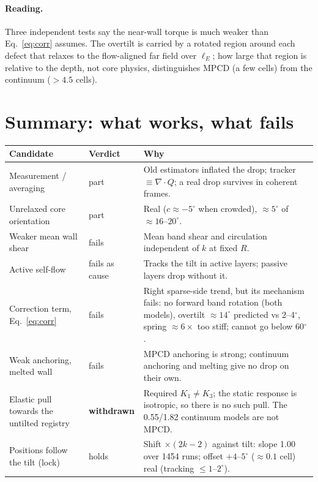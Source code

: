 \documentclass[11pt,a4paper]{article}
\begin{document}
\paragraph{Reading.} Three independent tests say the near-wall torque is much weaker than Eq.~\eqref{eq:corr} assumes. The overtilt is carried by a rotated
region around each defect that relaxes to the flow-aligned far field over $\ell_E$; how large that region is relative to the depth, not core physics,
distinguishes MPCD (a few cells) from the continuum ($>4.5$ cells).

\section{Summary: what works, what fails}

\begin{center}\small
\begin{tabular}{p{4.3cm}p{2cm}p{8.4cm}}
\toprule
Candidate & Verdict & Why \\
\midrule
Measurement / averaging & part & Old estimators inflated the drop; tracker $\equiv\nabla\!\cdot\!Q$; a real drop survives in coherent frames. \\
Unrelaxed core orientation & part & Real ($c\approx-5^\circ$ when crowded), $\approx5^\circ$ of $\approx16$--$20^\circ$. \\
Weaker mean wall shear & fails & Mean band shear and circulation independent of $k$ at fixed $R$. \\
Active self-flow & fails as cause & Tracks the tilt in active layers; passive layers drop without it. \\
Correction term, Eq.~\eqref{eq:corr} & fails & Right sparse-side trend, but its mechanism fails: no forward band rotation (both models), overtilt $\approx14^\circ$ predicted vs 2--4$^\circ$, spring $\approx6\times$ too stiff; cannot go below 60$^\circ$. \\
Weak anchoring, melted wall & fails & MPCD anchoring is strong; continuum anchoring and melting give no drop on their own. \\
Elastic pull towards the untilted registry & \textbf{withdrawn} & Required $K_1\neq K_3$; the static response is isotropic, so there is no such pull. The 0.55/1.82 continuum models are not MPCD. \\
Positions follow the tilt (lock) & holds & Shift $\times(2k-2)$ against tilt: slope 1.00 over 1454 runs; offset $+4$--$5^\circ$ ($\approx0.1$ cell) real (tracking $\le1$--$2^\circ$). \\

\end{tabular}
\end{center}
\end{document}
